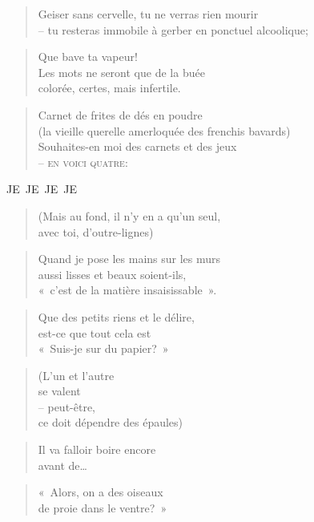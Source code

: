  \begin{verse}
    Geiser sans cervelle, tu ne verras rien mourir\\
    -- tu resteras immobile à gerber en ponctuel alcoolique;
  \end{verse}
  \begin{verse}
    Que bave ta vapeur!\\
    Les mots ne seront que de la buée\\
    colorée, certes, mais infertile.
  \end{verse}
  \begin{verse}
    Carnet de frites de dés en poudre\\
    (la vieille querelle amerloquée des frenchis bavards)\\
    Souhaites-en moi des carnets et des jeux\\
    -- \textsc{en voici quatre}:
  \end{verse}
  \begin{center}
    \textsc{JE~JE~JE~JE}
  \end{center}
  \begin{verse}
    (Mais au fond, il n’y en a qu’un seul,\\
    avec toi, d’outre-lignes)
  \end{verse}
  \begin{verse}
    Quand je pose les mains sur les murs\\
    aussi lisses et beaux soient-ils,\\
    «~c’est de la matière insaisissable~».
  \end{verse}
  \begin{verse}
    Que des petits riens et le délire,\\
    est-ce que tout cela est\\
    «~Suis-je sur du papier?~»
  \end{verse}
  \begin{verse}
    (L’un et l’autre\\
    se valent\\
    -- peut-être,\\
    ce doit dépendre des épaules)
  \end{verse}
  \begin{verse}
    Il va falloir boire encore\\
    avant de…
  \end{verse}
  \begin{verse}
    «~Alors, on a des oiseaux\\
    de proie dans le ventre?~»
  \end{verse}
